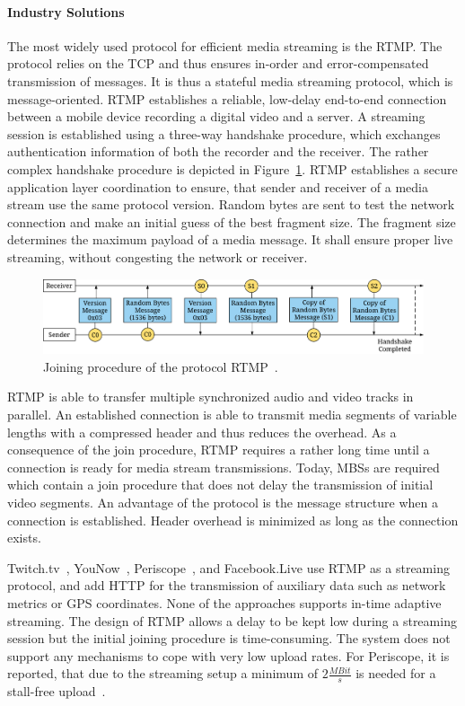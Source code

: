 \paragraph{Industry Solutions}
The most widely used protocol for efficient media streaming is the \ac{RTMP}.
The protocol relies on the \ac{TCP} and thus ensures in-order and error-compensated transmission of messages.
It is thus a stateful media streaming protocol, which is message-oriented. 
\ac{RTMP} establishes a reliable, low-delay end-to-end connection between a mobile device recording a digital video and a server. 
A streaming session is established using a three-way handshake procedure, which exchanges authentication information of both the recorder and the receiver. 
The rather complex handshake procedure is depicted in Figure~\ref{fig:220_RTMP_Handshake}.
\ac{RTMP} establishes a secure application layer coordination to ensure, that sender and receiver of a media stream use the same protocol version.
Random bytes are sent to test the network connection and make an initial guess of the best fragment size.
The fragment size determines the maximum payload of a media message.
It shall ensure proper live streaming, without congesting the network or receiver.
\begin{figure}[htb]
	\centering
	\includegraphics[width=\linewidth]{./gfx/500_MobileUpload/RTMP_Messages}
	\caption[Joining procedure of the protocol RTMP]{Joining procedure of the protocol RTMP~\cite{RTMP2009}.}
	\label{fig:220_RTMP_Handshake}
\end{figure}
\ac{RTMP} is able to transfer multiple synchronized audio and video tracks in parallel.
An established connection is able to transmit media segments of variable lengths with a compressed header and thus reduces the overhead.
As a consequence of the join procedure, \ac{RTMP} requires a rather long time until a connection is ready for media stream transmissions.
Today, \ac{MBS}s are required which contain a join procedure that does not delay the transmission of initial video segments. 
An advantage of the protocol is the message structure when a connection is established.
Header overhead is minimized as long as the connection exists. 

Twitch.tv~\cite{Zhang2015}, YouNow~\cite{Stohr2015}, Periscope~\cite{Siekkinen2016}, and Facebook.Live use \ac{RTMP} as a streaming protocol, and add HTTP for the transmission of auxiliary data such as network metrics or \ac{GPS} coordinates.
None of the approaches supports in-time adaptive streaming.
The design of \ac{RTMP} allows a delay to be kept low during a streaming session but the initial joining procedure is time-consuming.
The system does not support any mechanisms to cope with very low upload rates. 
For Periscope, it is reported, that due to the streaming setup a minimum of $2 \unit{\frac{MBit}{s}}$ is needed for a stall-free upload~\cite{Siekkinen2016}.

